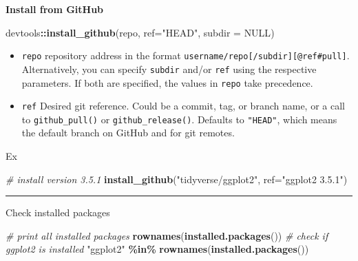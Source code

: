 \documentclass[
  a4paper,
  twoside,
  openright]{book}
\newenvironment{Shaded}{\begin{snugshade}}{\end{snugshade}}
\newcommand{\AttributeTok}[1]{\textcolor[rgb]{0.13,0.29,0.53}{#1}}
\newcommand{\CommentTok}[1]{\textcolor[rgb]{0.56,0.35,0.01}{\textit{#1}}}
\newcommand{\ConstantTok}[1]{\textcolor[rgb]{0.56,0.35,0.01}{#1}}
\newcommand{\FunctionTok}[1]{\textcolor[rgb]{0.13,0.29,0.53}{\textbf{#1}}}
\newcommand{\NormalTok}[1]{#1}
\newcommand{\SpecialCharTok}[1]{\textcolor[rgb]{0.81,0.36,0.00}{\textbf{#1}}}
\newcommand{\StringTok}[1]{\textcolor[rgb]{0.31,0.60,0.02}{#1}}
\providecommand{\tightlist}{%
  \setlength{\itemsep}{0pt}\setlength{\parskip}{0pt}}
\theoremstyle{definition}
\theoremstyle{definition}
\theoremstyle{definition}
\theoremstyle{definition}
\theoremstyle{remark}
\begin{document}
\textbf{Install from GitHub}

\begin{Shaded}
\begin{Highlighting}[]
\NormalTok{devtools}\SpecialCharTok{::}\FunctionTok{install\_github}\NormalTok{(repo, }\AttributeTok{ref=}\StringTok{"HEAD"}\NormalTok{, }\AttributeTok{subdir =} \ConstantTok{NULL}\NormalTok{)}
\end{Highlighting}
\end{Shaded}

\begin{itemize}
\tightlist
\item
  \texttt{repo} repository address in the format \texttt{username/repo{[}/subdir{]}{[}@ref\textbar{}\#pull{]}}. Alternatively, you can specify \texttt{subdir} and/or \texttt{ref} using the respective parameters. If both are specified, the values in \texttt{repo} take precedence.
\item
  \texttt{ref} Desired git reference. Could be a commit, tag, or branch name, or a call to \texttt{github\_pull()} or \texttt{github\_release()}. Defaults to \texttt{"HEAD"}, which means the default branch on GitHub and for git remotes.
\end{itemize}

Ex

\begin{Shaded}
\begin{Highlighting}[]
\CommentTok{\# install version 3.5.1}
\FunctionTok{install\_github}\NormalTok{(}\StringTok{"tidyverse/ggplot2"}\NormalTok{, }\AttributeTok{ref=}\StringTok{"ggplot2 3.5.1"}\NormalTok{)}
\end{Highlighting}
\end{Shaded}

\begin{center}\rule{0.5\linewidth}{0.5pt}\end{center}

Check installed packages

\begin{Shaded}
\begin{Highlighting}[]
\CommentTok{\# print all installed packages}
\FunctionTok{rownames}\NormalTok{(}\FunctionTok{installed.packages}\NormalTok{())}
\CommentTok{\# check if \textasciigrave{}ggplot2\textasciigrave{} is installed}
\StringTok{"ggplot2"} \SpecialCharTok{\%in\%} \FunctionTok{rownames}\NormalTok{(}\FunctionTok{installed.packages}\NormalTok{())}
\end{Highlighting}
\end{Shaded}
\end{document}
